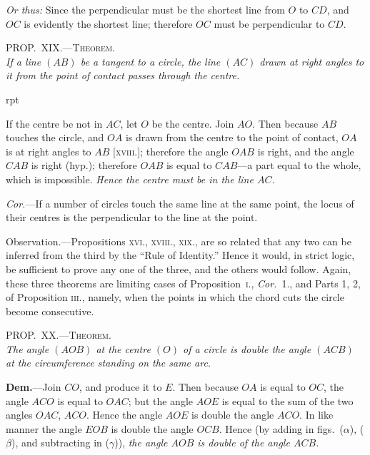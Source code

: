 \documentclass[oneside]{book}
\newcounter{wrapwidth}
\newcommand\myprop[2]{
\bigskip\Needspace*{4\baselineskip}\begin{center}\textsc{#1}\\\medskip\emph{#2}\par\end{center}
}
\newcommand\imgflow[3]{
\setcounter{wrapwidth}{#1}

\begin{wrapfigure}[#2]{r}{\value{wrapwidth}pt}
\begin{center}
\vspace{-0.3in}

\end{center}
\end{wrapfigure}
}
\newcommand\imgcent[2]{
\begin{center}

\end{center}
}
\begin{document}
\begin{footnotesize}
\emph{Or thus:} Since the perpendicular must be the shortest line
from $O$ to $CD$, and $OC$ is evidently the shortest line; therefore
$OC$ must be perpendicular to $CD$.
\end{footnotesize}

\myprop{PROP\@.~XIX\@.---Theorem.}{If a line $(AB)$ be a tangent to a circle, the line $(AC)$
drawn at right angles to it from the point of contact passes
through the centre.}


\imgflow{130}{11}{f125}

If the centre be not in $AC$, let $O$ be the centre.
Join $AO$. Then because $AB$
touches the circle, and $OA$ is
drawn from the centre to the
point of contact, $OA$ is at right
angles to $AB$ [\textsc{xviii.}]; therefore
the angle $OAB$ is right,
and the angle $CAB$ is right
(hyp.); therefore $OAB$ is equal
to $CAB$---a part equal to the
whole, which is impossible.
\emph{Hence the centre must be in the line $AC$.}



\emph{Cor.}---If a number of circles touch the same line at
the same point, the locus of their centres is the perpendicular
to the line at the point.\par\medskip

\begin{footnotesize}
\textsf{Observation.}---Propositions \textsc{xvi., xviii., xix.,} are so related
that any two can be inferred from the third by the ``Rule of
Identity.'' Hence it would, in strict logic, be sufficient to prove
any one of the three, and the others would follow. Again, these
three theorems are limiting cases of Proposition~\textsc{i.}, \emph{Cor.}~1., and
Parts 1, 2, of Proposition \textsc{iii.}, namely, when the points in which
the chord cuts the circle become consecutive.
\end{footnotesize}

\myprop{PROP\@.~XX\@.---Theorem.}{The angle $(AOB)$ at the centre $(O)$ of a circle is double
the angle $(ACB)$ at the circumference standing on the
same arc.}


\imgcent{325}{f126}

\textbf{Dem.}---Join $CO$, and produce it to $E$. Then because
$OA$ is equal to $OC$, the angle $ACO$ is equal to $OAC$;
but the angle $AOE$ is equal to the sum of the two
angles $OAC$, $ACO$. Hence the angle $AOE$ is double
the angle $ACO$. In like manner the angle $EOB$ is
double the angle $OCB$. Hence (by adding in figs.~($\alpha$),
($\beta$), and subtracting in ($\gamma$)), \emph{the angle $AOB$ is double of
the angle $ACB$.}\par\smallskip
\end{document}
